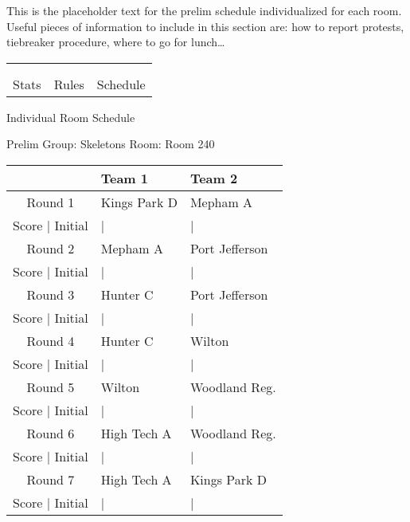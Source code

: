 \documentclass{article}%
\begin{document}
\vspace*{16pt}%
\linebreak%
This is the placeholder text for the prelim schedule individualized for each room. Useful pieces of information to include in this section are: how to report protests, tiebreaker procedure, where to go for lunch…%
\vspace*{30pt}%
\newline%
%
\begin{tabularx}{\textwidth}{YYY}%
  &  &  \\%
\\%
Stats&Rules&Schedule\\%
\end{tabularx}%
\newpage%
\begin{center}%
\begin{Huge}%
Individual Room Schedule%
\end{Huge}%
\vspace*{16pt}%
\linebreak%
\begin{Large}%
Prelim Group: Skeletons \hfill Room: Room 240%
\end{Large}%
\end{center}%
%
\begin{tabularx}{\textwidth}{|c|Y|Y|}%
\hline%
&Team 1&Team 2\\%
\hline%
Round 1&Kings Park D&Mepham A\\%
\hline%
Score | Initial&|&|\\%
\hline%
Round 2&Mepham A&Port Jefferson\\%
\hline%
Score | Initial&|&|\\%
\hline%
Round 3&Hunter C&Port Jefferson\\%
\hline%
Score | Initial&|&|\\%
\hline%
Round 4&Hunter C&Wilton\\%
\hline%
Score | Initial&|&|\\%
\hline%
Round 5&Wilton&Woodland Reg.\\%
\hline%
Score | Initial&|&|\\%
\hline%
Round 6&High Tech A&Woodland Reg.\\%
\hline%
Score | Initial&|&|\\%
\hline%
Round 7&High Tech A&Kings Park D\\%
\hline%
Score | Initial&|&|\\%
\hline%
\end{tabularx}%
\end{document}
